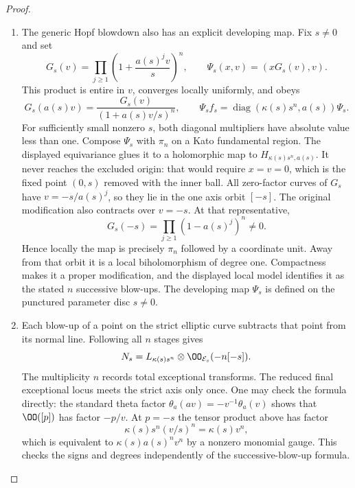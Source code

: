 \begin{proof}
\begin{enumerate}[label=\arabic*.,leftmargin=*]
\item The generic Hopf blowdown also has an explicit
developing map. Fix $s\ne0$ and set
\[
 G_s(v)=\prod_{j\ge1}\left(1+\frac{a(s)^j v}{s}\right)^n,
       \qquad
 \Psi_s(x,v)=(xG_s(v),v).
\]
This product is entire in $v$, converges locally uniformly, and obeys
\[
 G_s(a(s)v)=\frac{G_s(v)}{(1+a(s)v/s)^n},\qquad
 \Psi_s f_s=\operatorname{diag}(\kappa(s)s^n,a(s))\Psi_s.
\]
For sufficiently small nonzero $s$, both diagonal multipliers have
absolute value less than one. Compose $\Psi_s$ with $\pi_n$ on a
Kato fundamental region. The displayed equivariance glues it to a
holomorphic map to $H_{\kappa(s)s^n,a(s)}$.
It never reaches the excluded origin: that would require
$x=v=0$, which is the fixed point $(0,s)$ removed with the inner ball.
All zero-factor curves of $G_s$ have
$v=-s/a(s)^j$, so they lie in the one axis orbit $[-s]$.
The original modification also contracts over $v=-s$.
At that representative,
\[
 G_s(-s)=\prod_{j\ge1}(1-a(s)^j)^n\ne0.
\]
Hence locally the map is precisely $\pi_n$ followed by a coordinate
unit. Away from that orbit it is a local biholomorphism of degree
one. Compactness makes it a proper modification, and the displayed
local model identifies it as the stated $n$ successive blow-ups.
The developing map $\Psi_s$ is defined on the punctured parameter disc $s\ne0$.

\item Each blow-up of a point on the strict elliptic curve subtracts that
point from its normal line. Following all $n$ stages gives
\[
 N_s=L_{\kappa(s)s^n}\otimes\OO_{\mathcal E_s}(-n[-s]).
\]
The multiplicity $n$ records total exceptional transforms.
The reduced final exceptional locus meets the strict axis only once.
One may check the formula directly: the standard theta factor
$\theta_a(av)=-v^{-1}\theta_a(v)$ shows that $\OO([p])$
has factor $-p/v$. At $p=-s$ the tensor product above has factor
\[
 \kappa(s)s^n(v/s)^n=\kappa(s)v^n,
\]
which is equivalent to $\kappa(s)a(s)^n v^n$ by a nonzero monomial
gauge. This checks the signs and degrees independently of the
successive-blow-up formula.


\end{enumerate}
\end{proof}
